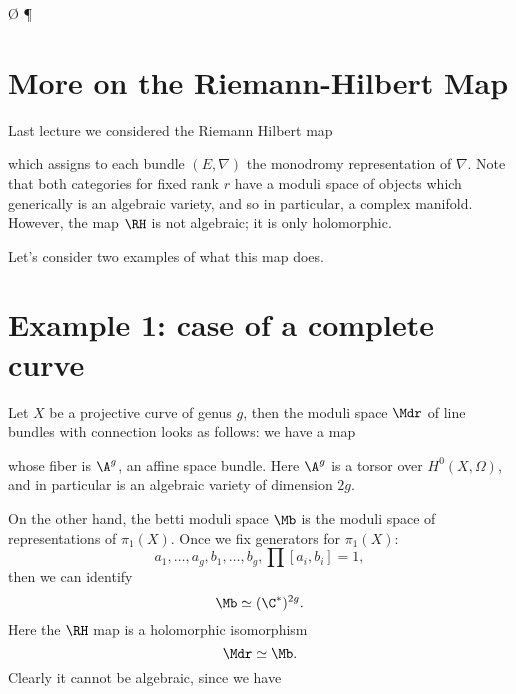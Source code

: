 \documentclass[etingof-dmod.tex]{subfiles}
\begin{document}
\nc{}
\nc{}
\nc{}
\nc{}
\nc{}
\nc{}
\nc{}
\nc{}
\nc{}
\nc{}
\nc{}
\nc{}
\nc{}
\rc\O{}
\rc\P{}
\nc{}
\nc{}
\nc{}
\nc{}
\nc{}
\nc{}
\nc{}
\nc{}

\section{More on the Riemann-Hilbert Map}
  Last lecture we considered the Riemann Hilbert map


which assigns to each bundle $(E,\nabla)$ the monodromy representation of
$\nabla$. Note that both categories for fixed rank $r$ have a moduli space of
objects which generically is an algebraic variety, and so in particular, a
complex manifold. However, the map $\RH$ is not algebraic; it is only
holomorphic.

Let's consider two examples of what this map does.

\section{Example 1: case of a complete curve}
  Let $X$ be a projective curve of genus $g$, then the moduli space $\Mdr$ of line bundles
  with connection looks as follows: we have a map
  whose fiber is $\A^g$, an affine space bundle. Here $\A^g$ is a torsor over
  $H^0(X,\Omega)$, and in particular is an algebraic variety of dimension $2g$.

  On the other hand, the betti moduli space $\Mb$ is the moduli space of
  representations of $\pi_1(X)$. Once we fix generators for $\pi_1(X)$: $$a_1,
  \ldots, a_g, b_1, \ldots, b_g, \prod[a_i,b_i]=1,$$
  then we can identify $$\Mb \simeq (\C^*)^{2g}.$$
  Here the $\RH$ map is a holomorphic isomorphism $$\Mdr \simeq \Mb.$$ Clearly
  it cannot be algebraic, since we have
\end{document}

